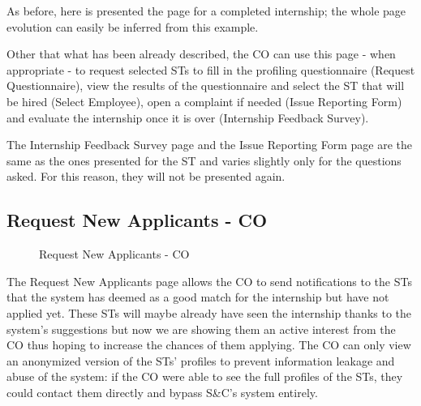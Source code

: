 \par As before, here is presented the page for a completed internship; the whole page evolution can easily be inferred
from this example.

\par Other that what has been already described, the CO can use this page - when appropriate - to request selected
STs to fill in the profiling questionnaire (Request Questionnaire), view the results of the questionnaire and select
the ST that will be hired (Select Employee), open a complaint if needed (Issue Reporting Form) and evaluate the
internship once it is over (Internship Feedback Survey).

\par The Internship Feedback Survey page and the Issue Reporting Form page are the same as the ones presented for the
ST and varies slightly only for the questions asked. For this reason, they will not be presented again.

\subsection{Request New Applicants - CO}
\label{subsec:request-new-applicants-co}%

\begin{figure}[H]
    \centering
    \caption{Request New Applicants - CO}
    \label{fig:request-new-applicants-co}
\end{figure}

\par The Request New Applicants page allows the CO to send notifications to the STs that the system has deemed as a
good match for the internship but have not applied yet. These STs will maybe already have seen the internship thanks
to the system's suggestions but now we are showing them an active interest from the CO thus hoping to increase the
chances of them applying. The CO can only view an anonymized version of the STs' profiles to prevent information
leakage and abuse of the system: if the CO were able to see the full profiles of the STs, they could contact them
directly and bypass S\&C's system entirely.

